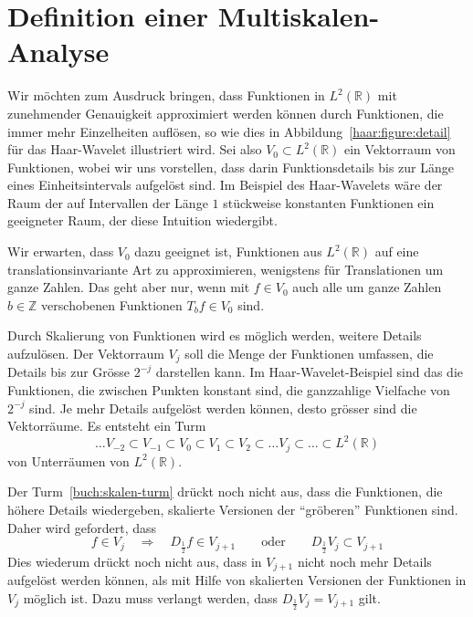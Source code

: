 %
%
%
\section{Definition einer Multiskalen-Analyse
\label{section:skalen und vektorraeume}}
Wir möchten zum Ausdruck bringen, dass Funktionen in $L^2(\mathbb R)$
mit zunehmender Genauigkeit approximiert werden können durch Funktionen,
die immer mehr Einzelheiten auflösen, so wie dies in
Abbildung~\ref{haar:figure:detail} für das Haar-Wavelet illustriert wird.
Sei also $V_0\subset L^2(\mathbb R)$ ein Vektorraum von Funktionen, wobei wir
uns vorstellen, dass darin Funktionsdetails bis zur Länge eines
Einheitsintervals aufgelöst sind.
Im Beispiel des Haar-Wavelets wäre der Raum der auf Intervallen der Länge
$1$ stückweise konstanten Funktionen ein geeigneter Raum,
der diese Intuition wiedergibt.

Wir erwarten, dass $V_0$ dazu geeignet ist, Funktionen aus $L^2(\mathbb R)$
auf eine translationsinvariante Art zu approximieren, wenigstens
für Translationen um ganze Zahlen.
Das geht aber nur, wenn mit $f\in V_0$ auch alle um ganze
Zahlen $b\in\mathbb Z$ verschobenen Funktionen $T_bf\in V_0$ sind.

Durch Skalierung von Funktionen wird es möglich werden, weitere Details
aufzulösen.
Der Vektorraum $V_j$ soll die Menge der Funktionen umfassen, die Details
bis zur Grösse $2^{-j}$ darstellen kann.
Im Haar-Wavelet-Beispiel sind das die Funktionen, die zwischen Punkten
konstant sind, die ganzzahlige Vielfache von $2^{-j}$ sind.
Je mehr Details aufgelöst werden können, desto grösser sind die
Vektorräume.
Es entsteht ein Turm
\begin{equation}
\dots
V_{-2}\subset
V_{-1}\subset
V_0\subset
V_1\subset
V_2\subset
\dots
V_j\subset
\dots
\subset L^2(\mathbb R)
\label{buch:skalen-turm}
\end{equation}
von Unterräumen von $L^2(\mathbb R)$.

Der Turm~\eqref{buch:skalen-turm} drückt noch nicht aus, dass die
Funktionen, die höhere Details wiedergeben, skalierte Versionen der
``gröberen'' Funktionen sind.
Daher wird gefordert, dass
\[
f\in V_j \quad\Rightarrow\quad D_{\frac12}f\in V_{j+1}
\qquad\text{oder}\qquad
D_{\frac12}V_j \subset V_{j+1}
\]
Dies wiederum drückt noch nicht aus, dass in $V_{j+1}$ nicht noch mehr
Details aufgelöst werden können, als mit Hilfe von skalierten Versionen der
Funktionen in $V_j$ möglich ist.
Dazu muss verlangt werden, dass
$D_{\frac12}V_j = V_{j+1}$
gilt.

